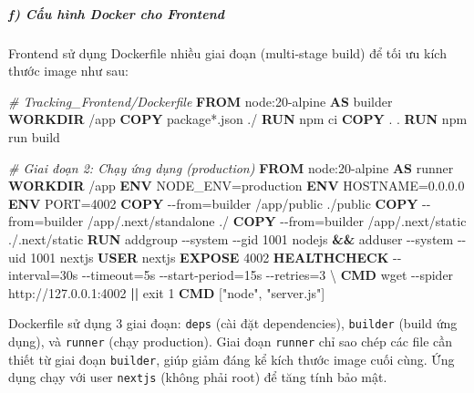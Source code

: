 \documentclass[13pt,a4paper]{extarticle}
\newenvironment{Shaded}{}{}
\newcommand{\AttributeTok}[1]{\textcolor[rgb]{0.49,0.56,0.16}{#1}}
\newcommand{\BuiltInTok}[1]{\textcolor[rgb]{0.00,0.50,0.00}{#1}}
\newcommand{\CommentTok}[1]{\textcolor[rgb]{0.38,0.63,0.69}{\textit{#1}}}
\newcommand{\ExtensionTok}[1]{#1}
\newcommand{\FunctionTok}[1]{\textcolor[rgb]{0.02,0.16,0.49}{#1}}
\newcommand{\KeywordTok}[1]{\textcolor[rgb]{0.00,0.44,0.13}{\textbf{#1}}}
\newcommand{\NormalTok}[1]{#1}
\newcommand{\OperatorTok}[1]{\textcolor[rgb]{0.40,0.40,0.40}{#1}}
\newcommand{\StringTok}[1]{\textcolor[rgb]{0.25,0.44,0.63}{#1}}
\renewcommand{\\}{\thesislongtableorignewline\hline}%
\begin{document}
\subparagraph{f) Cấu hình Docker cho
Frontend}\label{f-cux1ea5u-huxecnh-docker-cho-frontend}

Frontend sử dụng Dockerfile nhiều giai đoạn (multi-stage build) để tối
ưu kích thước image như sau:

\begin{Shaded}
\begin{Highlighting}[]
\CommentTok{\# Tracking\_Frontend/Dockerfile}
\KeywordTok{FROM}\NormalTok{ node:20{-}alpine }\KeywordTok{AS}\NormalTok{ builder}
\KeywordTok{WORKDIR}\NormalTok{ /app}
\KeywordTok{COPY}\NormalTok{ package*.json ./}
\KeywordTok{RUN} \ExtensionTok{npm}\NormalTok{ ci}
\KeywordTok{COPY}\NormalTok{ . .}
\KeywordTok{RUN} \ExtensionTok{npm}\NormalTok{ run build}

\CommentTok{\# Giai đoạn 2: Chạy ứng dụng (production)}
\KeywordTok{FROM}\NormalTok{ node:20{-}alpine }\KeywordTok{AS}\NormalTok{ runner}
\KeywordTok{WORKDIR}\NormalTok{ /app}
\KeywordTok{ENV}\NormalTok{ NODE\_ENV=production}
\KeywordTok{ENV}\NormalTok{ HOSTNAME=0.0.0.0}
\KeywordTok{ENV}\NormalTok{ PORT=4002}
\KeywordTok{COPY} \OperatorTok{{-}{-}from=builder}\NormalTok{ /app/public ./public}
\KeywordTok{COPY} \OperatorTok{{-}{-}from=builder}\NormalTok{ /app/.next/standalone ./}
\KeywordTok{COPY} \OperatorTok{{-}{-}from=builder}\NormalTok{ /app/.next/static ./.next/static}
\KeywordTok{RUN} \ExtensionTok{addgroup} \AttributeTok{{-}{-}system} \AttributeTok{{-}{-}gid}\NormalTok{ 1001 nodejs }\KeywordTok{\&\&} \ExtensionTok{adduser} \AttributeTok{{-}{-}system} \AttributeTok{{-}{-}uid}\NormalTok{ 1001 nextjs}
\KeywordTok{USER}\NormalTok{ nextjs}
\KeywordTok{EXPOSE}\NormalTok{ 4002}
\KeywordTok{HEALTHCHECK} \OperatorTok{{-}{-}interval=30s} \OperatorTok{{-}{-}timeout=5s} \OperatorTok{{-}{-}start{-}period=15s} \OperatorTok{{-}{-}retries=3}\NormalTok{ \textbackslash{}}
  \KeywordTok{CMD} \FunctionTok{wget} \AttributeTok{{-}{-}spider}\NormalTok{ http://127.0.0.1:4002 }\KeywordTok{||} \BuiltInTok{exit}\NormalTok{ 1}
\KeywordTok{CMD}\NormalTok{ [}\StringTok{"node"}\NormalTok{, }\StringTok{"server.js"}\NormalTok{]}
\end{Highlighting}
\end{Shaded}

Dockerfile sử dụng 3 giai đoạn: \texttt{deps} (cài đặt dependencies),
\texttt{builder} (build ứng dụng), và \texttt{runner} (chạy production).
Giai đoạn \texttt{runner} chỉ sao chép các file cần thiết từ giai đoạn
\texttt{builder}, giúp giảm đáng kể kích thước image cuối cùng. Ứng dụng
chạy với user \texttt{nextjs} (không phải root) để tăng tính bảo mật.
\end{document}
